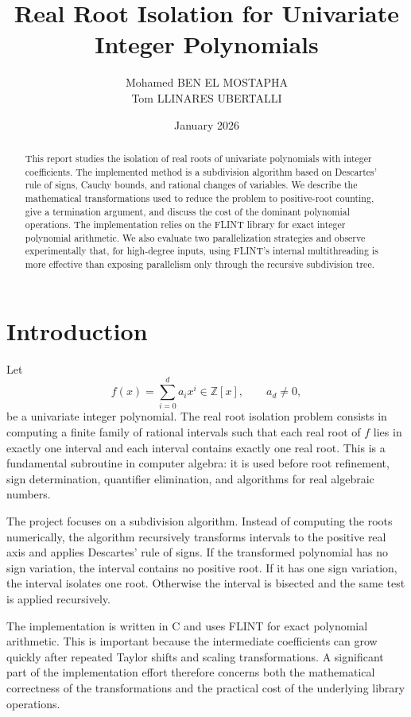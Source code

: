 \documentclass[letterpaper]{article}
\title{Real Root Isolation for Univariate Integer Polynomials}
\author{Mohamed BEN EL MOSTAPHA \\
Tom LLINARES UBERTALLI}
\date{January 2026}
\newcommand{\ZZ}{\mathbb{Z}}
\begin{document}
\maketitle

\begin{abstract}
This report studies the isolation of real roots of univariate polynomials with
integer coefficients. The implemented method is a subdivision algorithm based
on Descartes' rule of signs, Cauchy bounds, and rational changes of variables.
We describe the mathematical transformations used to reduce the problem to
positive-root counting, give a termination argument, and discuss the cost of
the dominant polynomial operations. The implementation relies on the FLINT
library for exact integer polynomial arithmetic. We also evaluate two
parallelization strategies and observe experimentally that, for high-degree
inputs, using FLINT's internal multithreading is more effective than exposing
parallelism only through the recursive subdivision tree.
\end{abstract}

\tableofcontents

\section{Introduction}

Let
\[
  f(x) = \sum_{i=0}^{d} a_i x^i \in \ZZ[x], \qquad a_d \neq 0,
\]
be a univariate integer polynomial. The real root isolation problem consists
in computing a finite family of rational intervals such that each real root of
$f$ lies in exactly one interval and each interval contains exactly one real
root. This is a fundamental subroutine in computer algebra: it is used before
root refinement, sign determination, quantifier elimination, and algorithms for
real algebraic numbers.

The project focuses on a subdivision algorithm. Instead of computing the roots
numerically, the algorithm recursively transforms intervals to the positive
real axis and applies Descartes' rule of signs. If the transformed polynomial
has no sign variation, the interval contains no positive root. If it has one
sign variation, the interval isolates one root. Otherwise the interval is
bisected and the same test is applied recursively.

The implementation is written in C and uses FLINT for exact polynomial
arithmetic. This is important because the intermediate coefficients can grow
quickly after repeated Taylor shifts and scaling transformations. A significant
part of the implementation effort therefore concerns both the mathematical
correctness of the transformations and the practical cost of the underlying
library operations.
\end{document}
